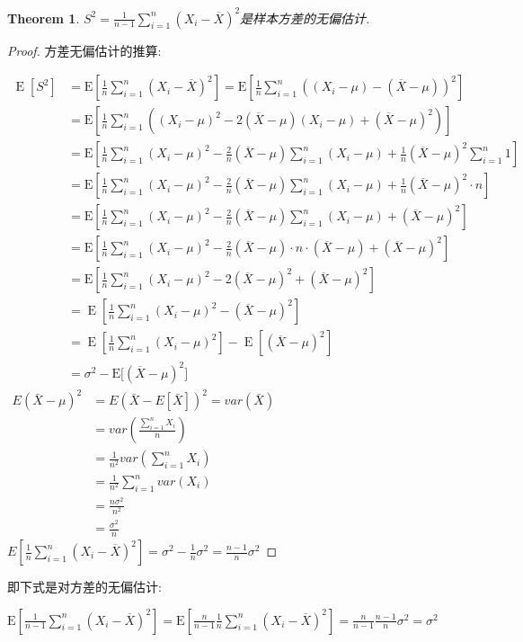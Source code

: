 \documentclass[UTF-8]{ctexart}
\newtheorem{theorem}{Theorem}[section]
\newtheorem{proof}{Proof}[section]
\begin{document}
\begin{theorem}
  $S^2=\frac{1}{n-1}\sum_{i=1}^n(X_i-\overline{X})^2$是样本方差的无偏估计.
\end{theorem}
\begin{proof}
方差无偏估计的推算:

\begin{math}
\begin{aligned}
\operatorname{E}[S^{2}]& =\mathrm{E}\left[\frac{1}{n}\sum_{i=1}^{n}\left(X_{i}-\overline{X}\right)^{2}\right]=\mathrm{E}\left[\frac{1}{n}\sum_{i=1}^{n}\left((X_{i}-\mu)-(\overline{X}-\mu)\right)^{2}\right] \\
&=\mathrm{E}\left[\frac{1}{n}\sum_{i=1}^{n}\left((X_{i}-\mu)^{2}-2(\overline{X}-\mu)(X_{i}-\mu)+(\overline{X}-\mu)^{2}\right)\right] \\
&=\mathrm{E}\left[\frac{1}{n}\sum_{i=1}^{n}(X_{i}-\mu)^{2}-\frac{2}{n}(\overline{X}-\mu)\sum_{i=1}^{n}(X_{i}-\mu)+\frac{1}{n}(\overline{X}-\mu)^{2}\sum_{i=1}^{n}1\right] \\
&=\mathrm{E}\left[\frac{1}{n}\sum_{i=1}^{n}(X_{i}-\mu)^{2}-\frac{2}{n}(\overline{X}-\mu)\sum_{i=1}^{n}(X_{i}-\mu)+\frac{1}{n}(\overline{X}-\mu)^{2}\cdot n\right] \\
&=\mathrm{E}\left[\frac{1}{n}\sum_{i=1}^{n}(X_{i}-\mu)^{2}-\frac{2}{n}(\overline{X}-\mu)\sum_{i=1}^{n}(X_{i}-\mu)+(\overline{X}-\mu)^{2}\right] \\
&=\mathrm{E}\left[\frac1n\sum_{i=1}^n(X_i-\mu)^2-\frac2n(\overline{X}-\mu)\cdot n\cdot(\overline{X}-\mu)+(\overline{X}-\mu)^2\right] \\
&=\mathrm{E}\left[\frac{1}{n}\sum_{i=1}^{n}(X_{i}-\mu)^{2}-2(\overline{X}-\mu)^{2}+(\overline{X}-\mu)^{2}\right] \\
&=\operatorname{E}\left[\frac1n\sum_{i=1}^n(X_i-\mu)^2-(\overline{X}-\mu)^2\right] \\
&=\operatorname{E}\left[\frac1n\sum_{i=1}^n(X_i-\mu)^2\right]-\operatorname{E}\left[(\overline{X}-\mu)^2\right] \\
&=\sigma^2-\mathrm{E}\Big[(\overline{X}-\mu)^2\Big]
\end{aligned}
\end{math}
\begin{math}
\begin{aligned}
E(\bar{X}-\mu)^2& =E(\bar{X}-E[\bar{X}])^2=var(\bar{X}) \\
&=var\left(\frac{\sum_{i=1}^nX_i}n\right) \\
&=\frac1{n^2}var\left(\sum_{i=1}^nX_i\right) \\
&=\frac1{n^2}\sum_{i=1}^nvar\left(X_i\right) \\
&=\frac{n\sigma^2}{n^2} \\
&=\frac{\sigma^2}n
\end{aligned}
\end{math}
$E[\frac{1}{n}\sum_{i=1}^n(X_i-\overline{X})^2]=\sigma^2-\frac{1}{n}\sigma^2=\frac{n-1}{n}\sigma^2$
\end{proof}

即下式是对方差的无偏估计:

$\mathrm{E}\left[\frac{1}{n-1}\sum_{i=1}^{n}\left(X_{i}-\overline{X}\right)^{2}\right]
=\mathrm{E}\left[\frac{n}{n-1}\frac{1}{n}\sum_{i=1}^{n}\left(X_{i}-\overline{X}\right)^{2}\right]
=\frac{n}{n-1}\frac{n-1}{n}\sigma^2
=\sigma^2$
\subsection{}
\end{document}
